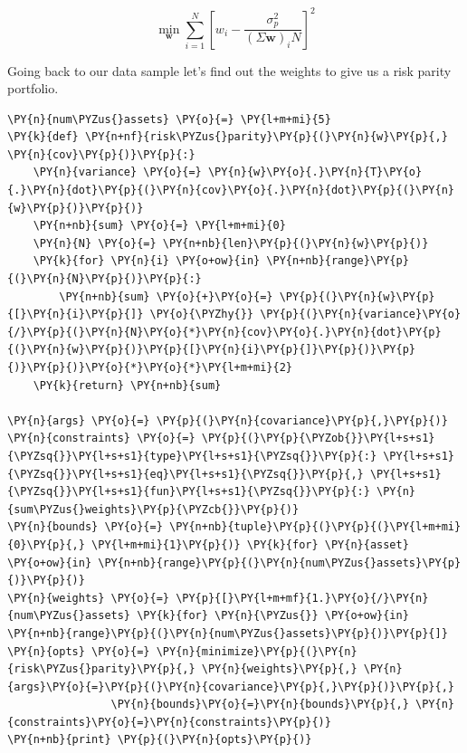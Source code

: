 \begin{equation} \underset{\mathbf{w}}{\min } \sum _{i=1}^{N}\left[w_{i}-{\frac {\sigma_p^{2}}{(\Sigma \mathbf{w})_{i}N}}\right]^{2} \end{equation}

Going back to our data sample let's find out the weights to give us a
risk parity portfolio.

\begin{codebox}
\begin{Verbatim}[commandchars=\\\{\}]
\PY{n}{num\PYZus{}assets} \PY{o}{=} \PY{l+m+mi}{5}
\PY{k}{def} \PY{n+nf}{risk\PYZus{}parity}\PY{p}{(}\PY{n}{w}\PY{p}{,} \PY{n}{cov}\PY{p}{)}\PY{p}{:}
    \PY{n}{variance} \PY{o}{=} \PY{n}{w}\PY{o}{.}\PY{n}{T}\PY{o}{.}\PY{n}{dot}\PY{p}{(}\PY{n}{cov}\PY{o}{.}\PY{n}{dot}\PY{p}{(}\PY{n}{w}\PY{p}{)}\PY{p}{)} 
    \PY{n+nb}{sum} \PY{o}{=} \PY{l+m+mi}{0}
    \PY{n}{N} \PY{o}{=} \PY{n+nb}{len}\PY{p}{(}\PY{n}{w}\PY{p}{)}
    \PY{k}{for} \PY{n}{i} \PY{o+ow}{in} \PY{n+nb}{range}\PY{p}{(}\PY{n}{N}\PY{p}{)}\PY{p}{:}
        \PY{n+nb}{sum} \PY{o}{+}\PY{o}{=} \PY{p}{(}\PY{n}{w}\PY{p}{[}\PY{n}{i}\PY{p}{]} \PY{o}{\PYZhy{}} \PY{p}{(}\PY{n}{variance}\PY{o}{/}\PY{p}{(}\PY{n}{N}\PY{o}{*}\PY{n}{cov}\PY{o}{.}\PY{n}{dot}\PY{p}{(}\PY{n}{w}\PY{p}{)}\PY{p}{[}\PY{n}{i}\PY{p}{]}\PY{p}{)}\PY{p}{)}\PY{p}{)}\PY{o}{*}\PY{o}{*}\PY{l+m+mi}{2} 
    \PY{k}{return} \PY{n+nb}{sum}
		
\PY{n}{args} \PY{o}{=} \PY{p}{(}\PY{n}{covariance}\PY{p}{,}\PY{p}{)}
\PY{n}{constraints} \PY{o}{=} \PY{p}{(}\PY{p}{\PYZob{}}\PY{l+s+s1}{\PYZsq{}}\PY{l+s+s1}{type}\PY{l+s+s1}{\PYZsq{}}\PY{p}{:} \PY{l+s+s1}{\PYZsq{}}\PY{l+s+s1}{eq}\PY{l+s+s1}{\PYZsq{}}\PY{p}{,} \PY{l+s+s1}{\PYZsq{}}\PY{l+s+s1}{fun}\PY{l+s+s1}{\PYZsq{}}\PY{p}{:} \PY{n}{sum\PYZus{}weights}\PY{p}{\PYZcb{}}\PY{p}{)} 
\PY{n}{bounds} \PY{o}{=} \PY{n+nb}{tuple}\PY{p}{(}\PY{p}{(}\PY{l+m+mi}{0}\PY{p}{,} \PY{l+m+mi}{1}\PY{p}{)} \PY{k}{for} \PY{n}{asset} \PY{o+ow}{in} \PY{n+nb}{range}\PY{p}{(}\PY{n}{num\PYZus{}assets}\PY{p}{)}\PY{p}{)}
\PY{n}{weights} \PY{o}{=} \PY{p}{[}\PY{l+m+mf}{1.}\PY{o}{/}\PY{n}{num\PYZus{}assets} \PY{k}{for} \PY{n}{\PYZus{}} \PY{o+ow}{in} \PY{n+nb}{range}\PY{p}{(}\PY{n}{num\PYZus{}assets}\PY{p}{)}\PY{p}{]}
\PY{n}{opts} \PY{o}{=} \PY{n}{minimize}\PY{p}{(}\PY{n}{risk\PYZus{}parity}\PY{p}{,} \PY{n}{weights}\PY{p}{,} \PY{n}{args}\PY{o}{=}\PY{p}{(}\PY{n}{covariance}\PY{p}{,}\PY{p}{)}\PY{p}{,}
                \PY{n}{bounds}\PY{o}{=}\PY{n}{bounds}\PY{p}{,} \PY{n}{constraints}\PY{o}{=}\PY{n}{constraints}\PY{p}{)}
\PY{n+nb}{print} \PY{p}{(}\PY{n}{opts}\PY{p}{)}


\end{Verbatim}
\end{codebox}
